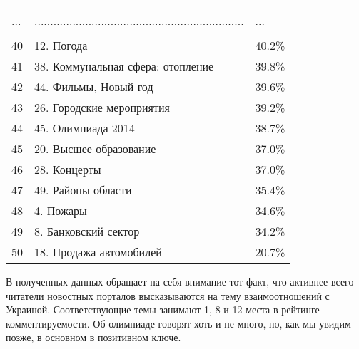 \begin{longtable}[c]{| L{3cm} | C{7cm} | R{5cm} |}
		& & \\
		... & .................................................................. & ... \\
		& & \\
		40 & 12. Погода & 40.2\% \\
		41 & 38. Коммунальная сфера: отопление & 39.8\% \\
		42 & 44. Фильмы, Новый год & 39.6\% \\
		43 & 26. Городские мероприятия & 39.2\% \\
		44 & 45. Олимпиада 2014 & 38.7\% \\
		45 & 20. Высшее образование & 37.0\% \\
		46 & 28. Концерты & 37.0\% \\
		47 & 49. Районы области & 35.4\% \\
		48 & 4. Пожары & 34.6\% \\
		49 & 8. Банковский сектор & 34.2\% \\
		50 & 18. Продажа автомобилей & 20.7\% \\
	\hline
\end{longtable}


В полученных данных обращает на себя внимание тот факт, что активнее всего читатели новостных порталов высказываются на тему взаимоотношений с Украиной. Соответствующие темы занимают 1, 8 и 12 места в рейтинге комментируемости. Об олимпиаде говорят хоть и не много, но, как мы увидим позже, в основном в позитивном ключе.

